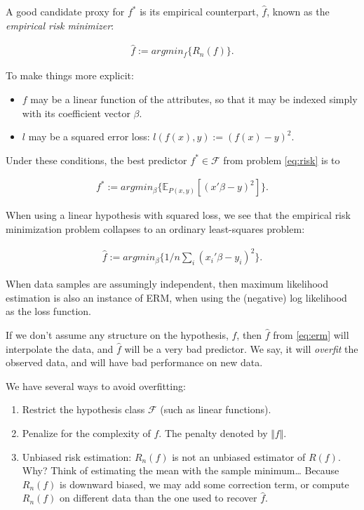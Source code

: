 \documentclass[]{book}
\providecommand{\tightlist}{%
  \setlength{\itemsep}{0pt}\setlength{\parskip}{0pt}}
\theoremstyle{definition}
\theoremstyle{definition}
\theoremstyle{definition}
\theoremstyle{remark}
\begin{document}
A good candidate proxy for \(f^*\) is its empirical counterpart,
\(\hat f\), known as the \emph{empirical risk minimizer}:

\begin{align}
  \hat f := argmin_f \{ R_n(f) \}.
  \label{eq:erm}  
\end{align}

To make things more explicit:

\begin{itemize}
\tightlist
\item
  \(f\) may be a linear function of the attributes, so that it may be
  indexed simply with its coefficient vector \(\beta\).
\item
  \(l\) may be a squared error loss: \(l(f(x),y):=(f(x)-y)^2\).
\end{itemize}

Under these conditions, the best predictor \(f^* \in \mathcal{F}\) from
problem \eqref{eq:risk} is to

\begin{align}
  f^* := argmin_\beta \{ \mathbb{E}_{P(x,y)}[(x'\beta-y)^2] \}.
\end{align}

When using a linear hypothesis with squared loss, we see that the
empirical risk minimization problem collapses to an ordinary
least-squares problem:

\begin{align}
  \hat f := argmin_\beta \{1/n \sum_i (x_i'\beta - y_i)^2 \}.
\end{align}

When data samples are assumingly independent, then maximum likelihood
estimation is also an instance of ERM, when using the (negative) log
likelihood as the loss function.

If we don't assume any structure on the hypothesis, \(f\), then
\(\hat f\) from \eqref{eq:erm} will interpolate the data, and \(\hat f\)
will be a very bad predictor. We say, it will \emph{overfit} the
observed data, and will have bad performance on new data.

We have several ways to avoid overfitting:

\begin{enumerate}
\def\labelenumi{\arabic{enumi}.}
\tightlist
\item
  Restrict the hypothesis class \(\mathcal{F}\) (such as linear
  functions).
\item
  Penalize for the complexity of \(f\). The penalty denoted by
  \(\Vert f \Vert\).
\item
  Unbiased risk estimation: \(R_n(f)\) is not an unbiased estimator of
  \(R(f)\). Why? Think of estimating the mean with the sample
  minimum\ldots{} Because \(R_n(f)\) is downward biased, we may add some
  correction term, or compute \(R_n(f)\) on different data than the one
  used to recover \(\hat f\).
\end{enumerate}
\end{document}
